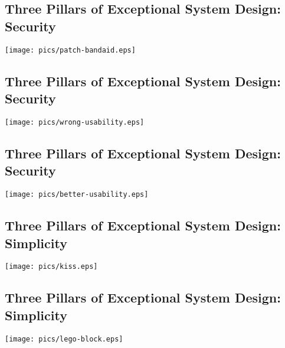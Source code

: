 \documentclass[xga]{xdvislides}
\begin{document}
\subsection{Three Pillars of Exceptional System Design: Security}
\vspace*{\fill}
\begin{center}
    \texttt{[image: pics/patch-bandaid.eps]} \\
\end{center}
\vspace*{\fill}

\subsection{Three Pillars of Exceptional System Design: Security}
\vspace*{\fill}
\begin{center}
    \texttt{[image: pics/wrong-usability.eps]} \\
\end{center}
\vspace*{\fill}

\subsection{Three Pillars of Exceptional System Design: Security}
\vspace*{\fill}
\begin{center}
    \texttt{[image: pics/better-usability.eps]} \\
\end{center}
\vspace*{\fill}


\subsection{Three Pillars of Exceptional System Design: Simplicity}
\vspace*{\fill}
\begin{center}
    \texttt{[image: pics/kiss.eps]} \\
\end{center}
\vspace*{\fill}

\subsection{Three Pillars of Exceptional System Design: Simplicity}
\vspace*{\fill}
\begin{center}
    \texttt{[image: pics/lego-block.eps]} \\
\end{center}
\vspace*{\fill}
\end{document}
